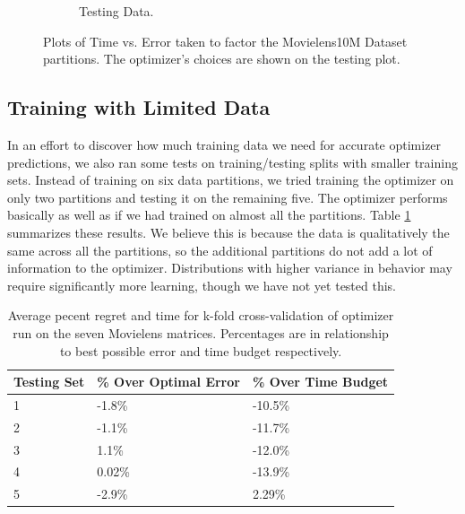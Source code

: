 \begin{figure}
\begin{subfigure}[b]{.45\textwidth}
\begin{center}
		\caption{Testing Data. }
\end{center}
	\end{subfigure}
\hfill
	\caption{Plots of Time vs. Error taken to factor the Movielens10M 
	Dataset partitions. The optimizer's choices are shown on the testing
	plot.}	

\end{figure}

\subsection{Training with Limited Data}
In an effort to discover how much training data we need for accurate 
optimizer predictions, we also ran some tests on training/testing 
splits with smaller training sets. Instead of training on six 
data partitions, we tried training the optimizer on only two partitions 
and testing it on the remaining five. The optimizer performs basically 
as well as if we had trained on almost all the partitions. 
Table \ref{fig:MovieTrain2Table} summarizes these results. We believe 
this is because the data is qualitatively the same across all the 
partitions, so the additional partitions do not add a lot of information 
to the optimizer. Distributions with higher variance in behavior 
may require significantly more learning, though we have not yet 
tested this. 

\begin{table}
\label{fig:MovieTrain2Table}
\begin{center}
    \begin{tabular}{| p{2.2cm} | p{2.2cm} | p{2.2cm} |}
    \hline
    Testing Set & \% Over Optimal Error & \% Over Time Budget \\ \hline
    1 & -1.8\% & -10.5\% \\ \hline
    2 & -1.1\% & -11.7\% \\ \hline
    3 & 1.1\% & -12.0\% \\ \hline
    4 & 0.02\% & -13.9\% \\ \hline
    5 & -2.9\% & 2.29\% \\ \hline
    \end{tabular}
\end{center}
\caption{Average pecent regret and time for k-fold cross-validation of optimizer run on the seven Movielens matrices. Percentages are in relationship to best possible error and time budget respectively.}
\end{table}

